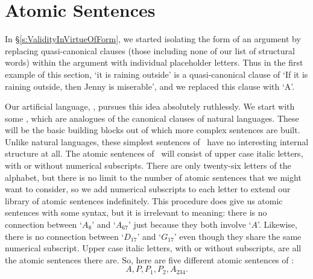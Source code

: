 \section{Atomic Sentences}
In §\ref{s:ValidityInVirtueOfForm}, we started isolating the form of an argument by replacing quasi-canonical clauses (those including none of our list of structural words) within the argument with individual placeholder letters. Thus in the first example of this section, `it is raining outside' is a quasi-canonical clause of `If it is raining outside, then Jenny is miserable', and we replaced this clause with `A'. 

Our artificial language, \TFL, pursues this idea absolutely ruthlessly. We start with some , which are analogues of the canonical clauses of natural languages.  These will be the basic building blocks out of which more complex sentences are built. Unlike natural languages, these simplest sentences of \TFL\ have no interesting internal structure at all. The atomic sentences of \TFL\ will consist of upper case italic letters, with or without numerical subscripts. There are only twenty-six letters of the alphabet, but there is no limit to the number of atomic sentences that we might want to consider, so we add numerical subscripts to each letter to extend our library of atomic sentences indefinitely. This procedure does give us atomic sentences with some syntax, but it is irrelevant to meaning: there is no connection between `$A_{8}$' and `$A_{67}$' just because they both involve `$A$'. Likewise, there is no connection between `$D_{17}$' and `$G_{17}$' even though they share the same numerical subscript. Upper case italic letters, with or without subscripts, are all the atomic sentences there are. So, here are five different atomic sentences of \TFL:
	$$A, P, P_{1}, P_{2}, A_{234}.$$ 

